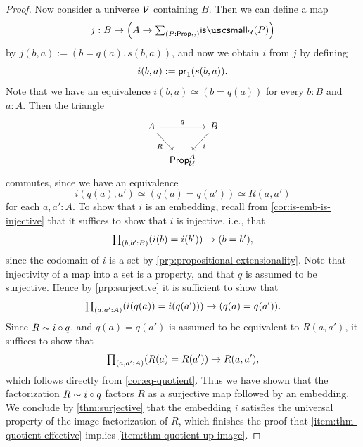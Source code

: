 \begin{proof}
  Now consider a universe $\mathcal{V}$ containing $B$. Then we can define a map
  \begin{equation*}
    j:B\to\Big(A\to\sm{P:\prop_\VV}\issmall_\UU(P)\Big)
  \end{equation*}
  by $j(b,a):=(b=q(a),s(b,a))$, and now we obtain $i$ from $j$ by defining
  \begin{equation*}
    i(b,a):=\mathsf{pr}_{1}(s(b,a)).
  \end{equation*}
  Note that we have an equivalence $i(b,a)\simeq (b=q(a))$ for every $b:B$ and $a:A$.
  Then the triangle
  \begin{equation*}
    \begin{tikzcd}[column sep=tiny]
      A \arrow[rr,"q"] \arrow[dr,swap,"R"] & & B \arrow[dl,"i"] \\
      & \prop_\UU^A
    \end{tikzcd}
  \end{equation*}
  commutes, since we have an equivalence
  \begin{equation*}
    i(q(a),a') \simeq (q(a)=q(a')) \simeq R(a,a')
  \end{equation*}
  for each $a,a':A$. To show that $i$ is an embedding, recall from \cref{cor:is-emb-is-injective} that it suffices to show that $i$ is injective, i.e., that
  \begin{equation*}
    \prd{b,b':B}(i(b)=i(b'))\to (b=b'),
  \end{equation*}
  since the codomain of $i$ is a set by \cref{prp:propositional-extensionality}. Note that injectivity of a map into a set is a property, and that $q$ is assumed to be surjective. Hence by \cref{prp:surjective} it is sufficient to show that
  \begin{equation*}
    \prd{a,a':A}(i(q(a))=i(q(a')))\to (q(a)=q(a')).
  \end{equation*}
  Since $R\sim i\circ q$, and $q(a)=q(a')$ is assumed to be equivalent to $R(a,a')$, it suffices to show that
  \begin{equation*}
    \prd{a,a':A}(R(a)=R(a'))\to R(a,a'),
  \end{equation*}
  which follows directly from \cref{cor:eq-quotient}. Thus we have shown that the factorization $R\sim i\circ q$ factors $R$ as a surjective map followed by an embedding. We conclude by \cref{thm:surjective} that the embedding $i$ satisfies the universal property of the image factorization of $R$, which finishes the proof that \ref{item:thm-quotient-effective} implies \ref{item:thm-quotient-up-image}.
  

\end{proof}
